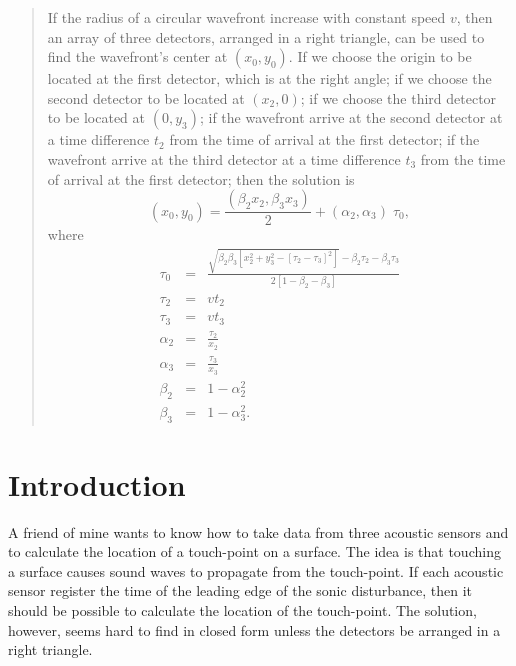 \documentclass[twocolumn]{article}
\begin{document}
\thispagestyle{fancy}

\begin{abstract}
   If the radius of a circular wavefront increase with constant speed $v$, then
   an array of three detectors, arranged in a right triangle, can be used to
   find the wavefront's center at $(x_0, y_0)$.  If we choose the origin to be
   located at the first detector, which is at the right angle; if we choose the
   second detector to be located at $(x_2, 0)$; if we choose the third detector
   to be located at $(0, y_3)$; if the wavefront arrive at the second detector
   at a time difference $t_2$ from the time of arrival at the first detector;
   if the wavefront arrive at the third detector at a time difference $t_3$
   from the time of arrival at the first detector; then the solution is
   \begin{equation*}
      (x_0, y_0) = \frac{(\beta_2 x_2, \beta_3 x_3)}{2} + (\alpha_2, \alpha_3)
                   \; \tau_0,
   \end{equation*}
   where
   \begin{eqnarray*}
      \tau_0 &=& \frac{\sqrt{\beta_2 \beta_3 \left[x_2^2 + y_3^2 - \left[\tau_2
                 - \tau_3\right]^2\right]} - \beta_2 \tau_2 - \beta_3 \tau_3}{2
                 \left[1 - \beta_2 - \beta_3\right]}\\[5pt]
      \tau_2 &=& vt_2\\
      \tau_3 &=& vt_3\\[5pt]
      \alpha_2 &=& \frac{\tau_2}{x_2}\\[5pt]
      \alpha_3 &=& \frac{\tau_3}{x_3}\\[5pt]
      \beta_2 &=& 1 - \alpha_2^2\\[5pt]
      \beta_3 &=& 1 - \alpha_3^2.
   \end{eqnarray*}
\end{abstract}

\section{Introduction}

A friend of mine wants to know how to take data from three acoustic sensors and
to calculate the location of a touch-point on a surface.  The idea is that
touching a surface causes sound waves to propagate from the touch-point. If
each acoustic sensor register the time of the leading edge of the sonic
disturbance, then it should be possible to calculate the location of the
touch-point.  The solution, however, seems hard to find in closed form unless
the detectors be arranged in a right triangle.
\end{document}
